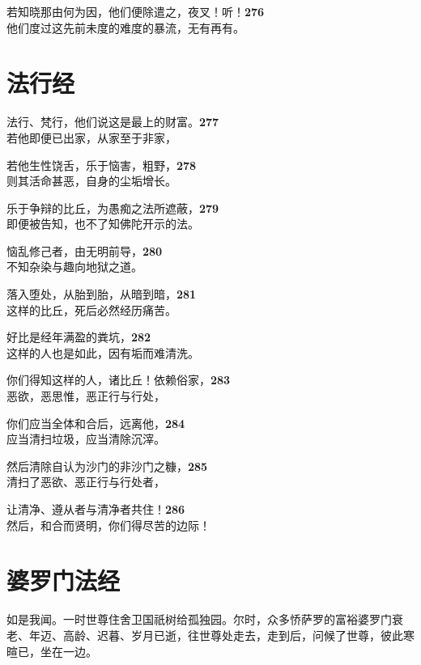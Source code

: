 若知晓那由何为因，他们便除遣之，夜叉！听！\hfill{\grayfootnotesize \textbf{276}} \\
他们度过这先前未度的难度的暴流，无有再有。


\section{法行经}


法行、梵行，他们说这是最上的财富。\hfill{\grayfootnotesize \textbf{277}} \\
若他即便已出家，从家至于非家，


若他生性饶舌，乐于恼害，粗野，\hfill{\grayfootnotesize \textbf{278}} \\
则其活命甚恶，自身的尘垢增长。


乐于争辩的比丘，为愚痴之法所遮蔽，\hfill{\grayfootnotesize \textbf{279}} \\
即便被告知，也不了知佛陀开示的法。


恼乱修己者，由无明前导，\hfill{\grayfootnotesize \textbf{280}} \\
不知杂染与趣向地狱之道。


落入堕处，从胎到胎，从暗到暗，\hfill{\grayfootnotesize \textbf{281}} \\
这样的比丘，死后必然经历痛苦。


好比是经年满盈的粪坑，\hfill{\grayfootnotesize \textbf{282}} \\
这样的人也是如此，因有垢而难清洗。


你们得知这样的人，诸比丘！依赖俗家，\hfill{\grayfootnotesize \textbf{283}} \\
恶欲，恶思惟，恶正行与行处，


你们应当全体和合后，远离他，\hfill{\grayfootnotesize \textbf{284}} \\
应当清扫垃圾，应当清除沉滓。


然后清除自认为沙门的非沙门之糠，\hfill{\grayfootnotesize \textbf{285}} \\
清扫了恶欲、恶正行与行处者，


让清净、遵从者与清净者共住！\hfill{\grayfootnotesize \textbf{286}} \\
然后，和合而贤明，你们得尽苦的边际！


\section{婆罗门法经}

如是我闻。一时世尊住舍卫国祇树给孤独园。尔时，众多㤭萨罗的富裕婆罗门衰老、年迈、高龄、迟暮、岁月已逝，往世尊处走去，走到后，问候了世尊，彼此寒暄已，坐在一边。


